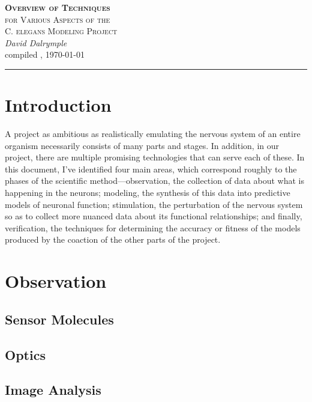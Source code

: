 \documentclass[letter,11pt]{article}
\begin{document}
\begin{center}
  \textsc{\LARGE \textbf{Overview of Techniques} \\[0.5mm] for Various Aspects of the \\[2.8mm] C. elegans Modeling Project}\\[3mm]
	\textit{\Large David Dalrymple}\\[2mm]
	{\large compiled \currenttime, \today\\[0mm]}
	\rule[2mm]{0.66\textwidth}{0.25mm}
\end{center}

\section*{Introduction}

A project as ambitious as realistically emulating the nervous system of an entire organism
necessarily consists of many parts and stages. In addition, in our project, there are
multiple promising technologies that can serve each of these. In this document, I've
identified four main areas, which correspond roughly to the phases of the scientific
method---observation, the collection of data about what is happening in the neurons;
modeling, the synthesis of this data into predictive models of neuronal function;
stimulation, the perturbation of the nervous system so as to collect more nuanced
data about its functional relationships; and finally, verification, the techniques
for determining the accuracy or fitness of the models produced by the coaction
of the other parts of the project.

\tableofcontents

\section{Observation}

\subsection{Sensor Molecules}

\subsection{Optics}



\subsection{Image Analysis}
\end{document}
